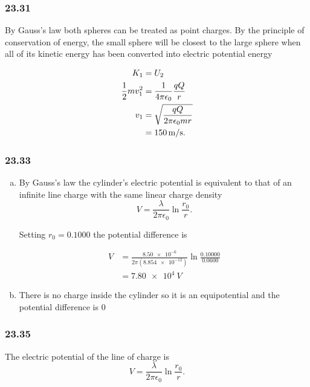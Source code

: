 \documentclass{article}
\begin{document}
\subsubsection{23.31}

By Gauss's law both spheres can be treated as point charges. By the principle of conservation of energy, the small sphere will be closest to the large sphere when all of its kinetic energy has been converted into electric potential energy

\begin{align*}
  K_1                 & = U_2                                    \\
  \frac{1}{2} m v_1^2 & = \frac{1}{4 \pi \epsilon_0} \frac{qQ}{r}                       \\
  v_1                 & = \sqrt{\frac{qQ}{2 \pi \epsilon_0 m r}} \\
                      & = \qty{150}{m/s}.
\end{align*}

\subsubsection{23.33}

\begin{enumerate}[a)]
  \item By Gauss's law the cylinder's electric potential is equivalent to that of an infinite line charge with the same linear charge density \[V = \frac{\lambda}{2 \pi \epsilon_0} \ln \frac{r_0}{r}.\]

        Setting $r_0 = 0.1000$ the potential difference is

        \begin{align*}
          V & = \frac{\num{8.50e-6}}{2 \pi (\num{8.854e-12})} \ln \frac{0.10000}{0.0600} \\
            & = \qty{7.80e4}{V}
        \end{align*}

  \item There is no charge inside the cylinder so it is an equipotential and the potential difference is $0$
\end{enumerate}

\subsubsection{23.35}

The electric potential of the line of charge is \[V = \frac{\lambda}{2 \pi \epsilon_0} \ln \frac{r_0}{r}.\]
\end{document}
